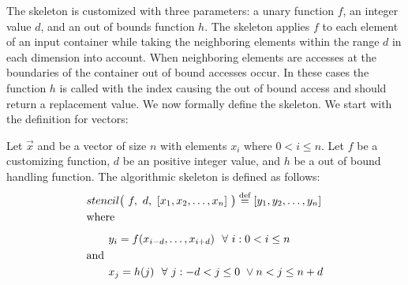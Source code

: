 The \stencil skeleton is customized with three parameters: a unary function $f$, an integer value $d$, and an out of bounds function $h$.
The skeleton applies $f$ to each element of an input container while taking the neighboring elements within the range $d$ in each dimension into account.
When neighboring elements are accesses at the boundaries of the container out of bound accesses occur.
In these cases the function $h$ is called with the index causing the out of bound access and should return a replacement value.
We now formally define the \stencil skeleton. We start with the definition for vectors:
\begin{definition}
  \label{definition:mapoverlap}
  Let $\vec{x}$ and be a vector of size $n$ with elements $x_i$ where $0 < i \leq n$.
  Let $f$ be a customizing function, $d$ be an positive integer value, and $h$ be a out of bound handling function.
  The algorithmic skeleton \stencil is defined as follows:
  \begin{equation*}
    \begin{split}
    &stencil \big(\ f,\  d,\ [x_1, x_2, \dots, x_n]\ \big) \eqdef [y_1, y_2, \dots, y_n]\\
    &\text{where}\\[.5em]
    &\qquad y_i = f(x_{i-d}, \ldots, x_{i+d}) \ \ \forall\ i :  0 < i \leq n\\
    &\text{and\hfill}\\
    &\qquad x_j = h(j) \ \ \forall\ j : -d < j \leq 0\ \vee n < j \leq n+d
    \end{split}
  \end{equation*}
\end{definition}

